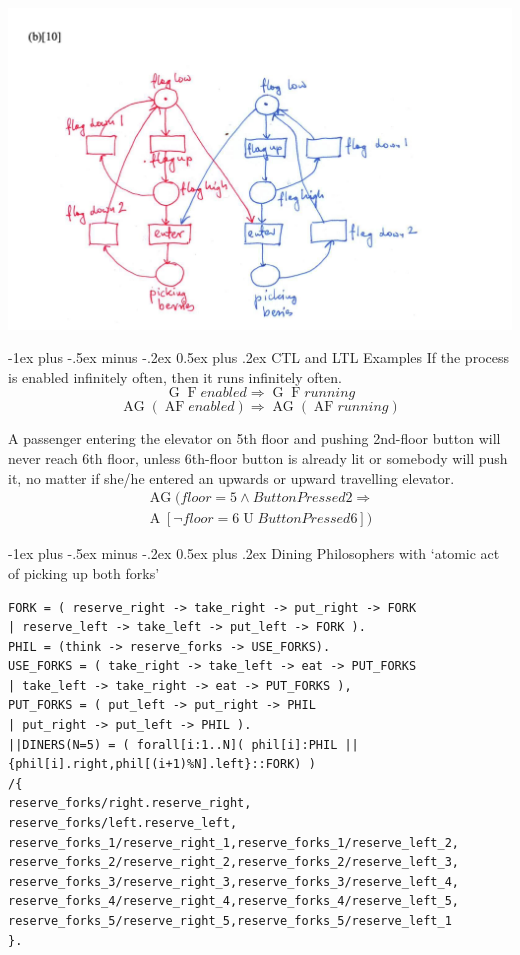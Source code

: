 \documentclass[letterpaper, 8pt]{extarticle}
\makeatletter
\renewcommand{\section}{\@startsection{section}{1}{0mm}%
                                {-1ex plus -.5ex minus -.2ex}%
                                {0.5ex plus .2ex}%
                                {\normalfont\normalsize\bfseries}}
\DeclareMathOperator{\F}{F}
\DeclareMathOperator{\G}{G}
\DeclareMathOperator{\U}{U}
\DeclareMathOperator{\A}{A}
\DeclareMathOperator{\AG}{AG}
\DeclareMathOperator{\AF}{AF}
\makeatother
\begin{document}
\begin{multicols*}{5}
\includegraphics[width = \linewidth]{COMPSCI-2SD3/warring_neighbours_partb.png}

\section{CTL and LTL Examples}
If the process is enabled infinitely often, then it runs infinitely often.
$$
\G\F enabled \Rightarrow \G\F running
$$
$$
\AG(\AF enabled) \Rightarrow \AG(\AF running)
$$

A passenger entering the elevator on 5th floor and pushing 2nd-floor button will never reach 6th floor, unless 6th-floor button is already lit or somebody will push it, no matter if she/he entered an upwards or upward travelling elevator.
\begin{align*}
\AG(floor=5 \land ButtonPressed2 \Rightarrow \\
\A[\neg floor=6 \U ButtonPressed6])
\end{align*}

\section{Dining Philosophers with ‘atomic act of picking up both forks’}
\begin{lstlisting}
FORK = ( reserve_right -> take_right -> put_right -> FORK
| reserve_left -> take_left -> put_left -> FORK ).
PHIL = (think -> reserve_forks -> USE_FORKS).
USE_FORKS = ( take_right -> take_left -> eat -> PUT_FORKS
| take_left -> take_right -> eat -> PUT_FORKS ),
PUT_FORKS = ( put_left -> put_right -> PHIL
| put_right -> put_left -> PHIL ).
||DINERS(N=5) = ( forall[i:1..N]( phil[i]:PHIL || {phil[i].right,phil[(i+1)%N].left}::FORK) )
/{
reserve_forks/right.reserve_right,
reserve_forks/left.reserve_left,
reserve_forks_1/reserve_right_1,reserve_forks_1/reserve_left_2,
reserve_forks_2/reserve_right_2,reserve_forks_2/reserve_left_3,
reserve_forks_3/reserve_right_3,reserve_forks_3/reserve_left_4,
reserve_forks_4/reserve_right_4,reserve_forks_4/reserve_left_5,
reserve_forks_5/reserve_right_5,reserve_forks_5/reserve_left_1
}.
\end{lstlisting}


\end{multicols*}
\end{document}
